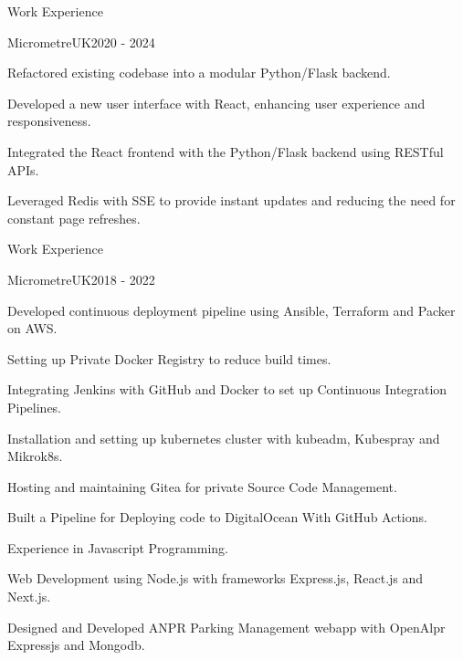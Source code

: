 \documentclass{resume}
\begin{document}
\begin{rSection}{Work Experience}
\begin{rSubsection}{MicrometreUK}{2020 - 2024}{}


\item Refactored existing codebase into a modular Python/Flask backend.
\item Developed a new user interface with React, enhancing user experience and responsiveness.
\item Integrated the React frontend with the Python/Flask backend using RESTful APIs.
\item Leveraged Redis  with SSE to provide instant updates and reducing the need for constant page refreshes.




\end{rSubsection}
\end{rSection}


\begin{rSection}{Work Experience}
\begin{rSubsection}{MicrometreUK}{2018 - 2022}{}

\item Developed continuous deployment pipeline using Ansible, Terraform and Packer on AWS. 
\item Setting up Private Docker Registry  to reduce build times.  
\item Integrating Jenkins with GitHub and Docker to set up Continuous Integration Pipelines.
\item Installation and setting up kubernetes cluster with kubeadm, Kubespray and Mikrok8s. 
\item Hosting and maintaining Gitea for private Source Code Management.
\item Built a Pipeline for  Deploying code to DigitalOcean With GitHub Actions.
\item Experience in Javascript Programming.
\item Web Development using Node.js with frameworks Express.js, React.js and Next.js.
\item Designed and Developed ANPR Parking Management webapp with OpenAlpr Expressjs and Mongodb.
\end{rSubsection}
\end{rSection}
\end{document}
